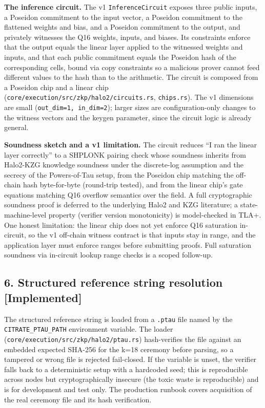 \textbf{The inference circuit.} The v1 \texttt{InferenceCircuit} exposes
three public inputs, a Poseidon commitment to the input vector, a
Poseidon commitment to the flattened weights and bias, and a Poseidon
commitment to the output, and privately witnesses the Q16 weights,
inputs, and biases. Its constraints enforce that the output equals the
linear layer applied to the witnessed weights and inputs, and that each
public commitment equals the Poseidon hash of the corresponding cells,
bound via copy constraints so a malicious prover cannot feed different
values to the hash than to the arithmetic. The circuit is composed from
a Poseidon chip and a linear chip
(\texttt{core/execution/src/zkp/halo2/circuits.rs}, \texttt{chips.rs}).
The v1 dimensions are small (\texttt{out\_dim=1,\ in\_dim=2}); larger
sizes are configuration-only changes to the witness vectors and the
keygen parameter, since the circuit logic is already general.

\textbf{Soundness sketch and a v1 limitation.} The circuit reduces ``I
ran the linear layer correctly'' to a SHPLONK pairing check whose
soundness inherits from Halo2-KZG knowledge soundness under the
discrete-log assumption and the secrecy of the Powers-of-Tau setup, from
the Poseidon chip matching the off-chain hash byte-for-byte (round-trip
tested), and from the linear chip's gate equations matching Q16 overflow
semantics over the field. A full cryptographic soundness proof is
deferred to the underlying Halo2 and KZG literature; a
state-machine-level property (verifier version monotonicity) is
model-checked in TLA+. One honest limitation: the linear chip does not
yet enforce Q16 saturation in-circuit, so the v1 off-chain witness
contract is that inputs stay in range, and the application layer must
enforce ranges before submitting proofs. Full saturation soundness via
in-circuit lookup range checks is a scoped follow-up.

\subsection{6. Structured reference string resolution
{[}Implemented{]}}\label{structured-reference-string-resolution-implemented}

The structured reference string is loaded from a \texttt{.ptau} file
named by the \texttt{CITRATE\_PTAU\_PATH} environment variable. The
loader (\texttt{core/execution/src/zkp/halo2/ptau.rs}) hash-verifies the
file against an embedded expected SHA-256 for the k=18 ceremony before
parsing, so a tampered or wrong file is rejected fail-closed. If the
variable is unset, the verifier falls back to a deterministic setup with
a hardcoded seed; this is reproducible across nodes but
cryptographically insecure (the toxic waste is reproducible) and is for
development and test only. The production runbook covers acquisition of
the real ceremony file and its hash verification.

